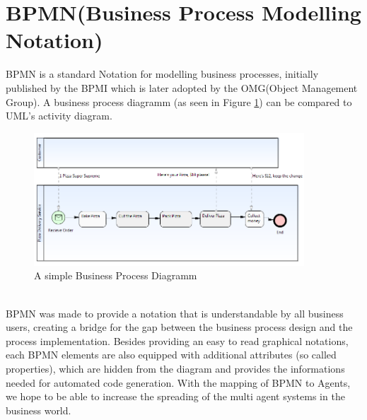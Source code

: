 \section{BPMN(Business Process Modelling Notation)}
BPMN \cite{BPMN2} is a standard Notation for modelling business processes, initially published by the BPMI which is later adopted by the OMG(Object Management Group). A business process diagramm (as seen in Figure \ref{fig:bpmn_sampl}) can be compared to UML's activity diagram.
\begin{figure}[h]
	\centering
		\includegraphics[width=0.90\textwidth]{images/bpmn_sampl.png}
	\caption{A simple Business Process Diagramm}
	\label{fig:bpmn_sampl}
\end{figure}\\
BPMN was made to provide a notation that is understandable by all business users, creating a bridge for the gap between the business process design and the process implementation. Besides providing an easy to read graphical notations, each BPMN elements are also equipped with additional attributes (so called properties), which are hidden from the diagram and provides the informations needed for automated code generation. With the mapping of BPMN to Agents, we hope to be able to increase the spreading of the multi agent systems in the business world.


